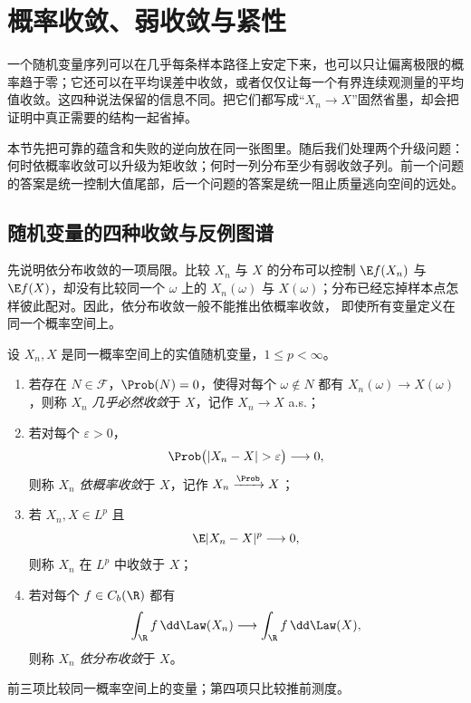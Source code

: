 \section{概率收敛、弱收敛与紧性}\label{sec:05-03}

一个随机变量序列可以在几乎每条样本路径上安定下来，也可以只让偏离极限的概率趋于零；它还可以在平均误差中收敛，或者仅仅让每一个有界连续观测量的平均值收敛。这四种说法保留的信息不同。把它们都写成“$X_n\to X$”固然省墨，却会把证明中真正需要的结构一起省掉。

本节先把可靠的蕴含和失败的逆向放在同一张图里。随后我们处理两个升级问题：何时依概率收敛可以升级为矩收敛；何时一列分布至少有弱收敛子列。前一个问题的答案是统一控制大值尾部，后一个问题的答案是统一阻止质量逃向空间的远处。


\subsection{随机变量的四种收敛与反例图谱}\label{subsec:5-3-1}

先说明依分布收敛的一项局限。比较 $X_n$ 与 $X$ 的分布可以控制
$\E f(X_n)$ 与 $\E f(X)$，却没有比较同一个 $\omega$ 上的 $X_n(\omega)$ 与
$X(\omega)$；分布已经忘掉样本点怎样彼此配对。因此，依分布收敛一般不能推出依概率收敛，
即使所有变量定义在同一个概率空间上。

\begin{definition}[四种收敛]\label{def:5-3-1-1}
设 $X_n,X$ 是同一概率空间上的实值随机变量，$1\le p<\infty$。
\begin{enumerate}
  \item 若存在 $N\in\mathcal F$，$\Prob(N)=0$，使得对每个 $\omega\notin N$ 都有 $X_n(\omega)\to X(\omega)$，则称 $X_n$ \emph{几乎必然收敛}于 $X$，记作 $X_n\to X$ a.s.；
  \item 若对每个 $\varepsilon>0$，
  \[
    \Prob\bigl(|X_n-X|>\varepsilon\bigr)\longrightarrow0,
  \]
  则称 $X_n$ \emph{依概率收敛}于 $X$，记作 $X_n\xrightarrow{\Prob}X$；
  \item 若 $X_n,X\in L^p$ 且
  \[
    \E|X_n-X|^p\longrightarrow0,
  \]
  则称 $X_n$ 在 $L^p$ 中收敛于 $X$；
  \item 若对每个 $f\in C_b(\R)$ 都有
  \[
    \int_{\R}f\,\dd\Law(X_n)\longrightarrow
    \int_{\R}f\,\dd\Law(X),
  \]
  则称 $X_n$ \emph{依分布收敛}于 $X$。
\end{enumerate}
前三项比较同一概率空间上的变量；第四项只比较推前测度。
\end{definition}

